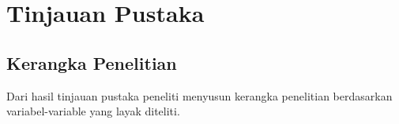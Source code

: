 \documentclass[12pt,oneside]{udthesis}\usepackage[]{graphicx}\usepackage[]{color}
\begin{document}

\newpage

\chapter{Tinjauan Pustaka}\label{chap:pstk}

\lipsum[2-4]

\section{Kerangka Penelitian}


Dari hasil tinjauan pustaka peneliti menyusun kerangka penelitian berdasarkan variabel-variable yang layak diteliti.
\end{document}
